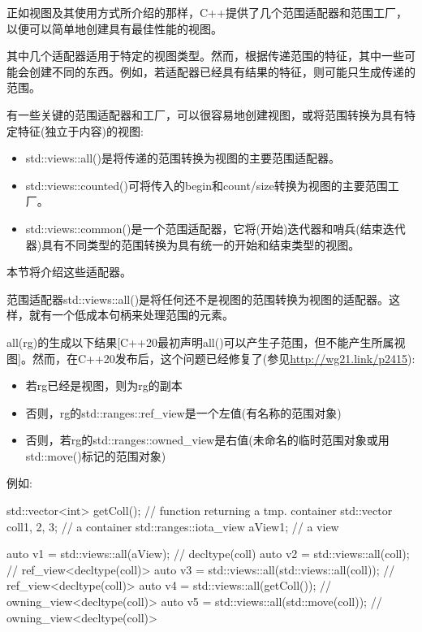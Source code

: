 
正如视图及其使用方式所介绍的那样，C++提供了几个范围适配器和范围工厂，以便可以简单地创建具有最佳性能的视图。

其中几个适配器适用于特定的视图类型。然而，根据传递范围的特征，其中一些可能会创建不同的东西。例如，若适配器已经具有结果的特征，则可能只生成传递的范围。

有一些关键的范围适配器和工厂，可以很容易地创建视图，或将范围转换为具有特定特征(独立于内容)的视图:

\begin{itemize}
\item
std::views::all()是将传递的范围转换为视图的主要范围适配器。

\item
std::views::counted()可将传入的begin和count/size转换为视图的主要范围工厂。

\item
std::views::common()是一个范围适配器，它将(开始)迭代器和哨兵(结束迭代器)具有不同类型的范围转换为具有统一的开始和结束类型的视图。
\end{itemize}

本节将介绍这些适配器。


范围适配器std::views::all()是将任何还不是视图的范围转换为视图的适配器。这样，就有一个低成本句柄来处理范围的元素。

all(rg)的生成以下结果[C++20最初声明all()可以产生子范围，但不能产生所属视图]。然而，在C++20发布后，这个问题已经修复了(参见\url{http://wg21.link/p2415}):

\begin{itemize}
\item
若rg已经是视图，则为rg的副本

\item
否则，rg的std::ranges::ref\_view是一个左值(有名称的范围对象)

\item
否则，若rg的std::ranges::owned\_view是右值(未命名的临时范围对象或用std::move()标记的范围对象)
\end{itemize}

例如:

\begin{cpp}
std::vector<int> getColl(); // function returning a tmp. container
std::vector coll{1, 2, 3}; // a container
std::ranges::iota_view aView{1}; // a view

auto v1 = std::views::all(aView); // decltype(coll)
auto v2 = std::views::all(coll); // ref_view<decltype(coll)>
auto v3 = std::views::all(std::views::all(coll)); // ref_view<decltype(coll)>
auto v4 = std::views::all(getColl()); // owning_view<decltype(coll)>
auto v5 = std::views::all(std::move(coll)); // owning_view<decltype(coll)>
\end{cpp}

